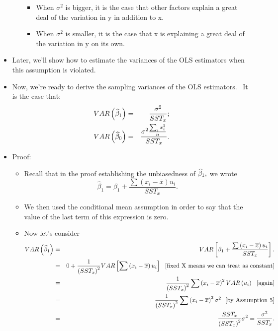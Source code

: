 \documentclass[11pt]{article}
\begin{document}
\begin{itemize}
\begin{itemize}
\begin{itemize}
\item When $\sigma ^{2}$ is bigger, it is the case that other factors
explain a great deal of the variation in y in addition to x.

\item When $\sigma ^{2}$ is smaller, it is the case that x is explaining a
great deal of the variation in y on its own.
\end{itemize}
\end{itemize}

\item Later, we'll show how to estimate the variances of the OLS estimators
when this assumption is violated.

\item Now, we're ready to derive the sampling variances of the OLS
estimators. \ It is the case that:%
\begin{eqnarray*}
VAR\left( \widehat{\beta }_{1}\right) &=&\frac{\sigma ^{2}}{SST_{x}}; \\
VAR\left( \widehat{\beta }_{0}\right) &=&\frac{\sigma ^{2}\frac{%
\sum\nolimits_{i}x_{i}^{2}}{n}}{SST_{x}}.
\end{eqnarray*}

\item Proof:

\begin{itemize}
\item Recall that in the proof establishing the unbiasedness of $\widehat{%
\beta }_{1},$ we wrote 
\begin{equation*}
\widehat{\beta }_{1}=\beta _{1}+\frac{\sum \left( x_{i}-\overline{x}\right)
u_{i}}{SST_{x}}.
\end{equation*}

\item We then used the conditional mean assumption in order to say that the
value of the last term of this expression is zero.

\item Now let's consider%
\begin{eqnarray*}
VAR\left( \widehat{\beta }_{1}\right) &=&VAR\left[ \beta _{1}+\frac{\sum
\left( x_{i}-\overline{x}\right) u_{i}}{SST_{x}}\right] . \\
&=&0+\frac{1}{\left( SST_{x}\right) ^{2}}VAR\left[ \sum \left( x_{i}-%
\overline{x}\right) u_{i}\right] \text{ \ [fixed X means we can treat as
constant]} \\
&=&\frac{1}{\left( SST_{x}\right) ^{2}}\sum \left( x_{i}-\overline{x}\right)
^{2}VAR\left( u_{i}\right) \text{ \ [again]} \\
&=&\frac{1}{\left( SST_{x}\right) ^{2}}\sum \left( x_{i}-\overline{x}\right)
^{2}\sigma ^{2}\text{ \ [by Assumption 5]} \\
&=&\frac{SST_{x}}{\left( SST_{x}\right) ^{2}}\sigma ^{2}=\frac{\sigma ^{2}}{%
SST_{x}}.
\end{eqnarray*}
\end{itemize}


\end{itemize}
\end{document}
